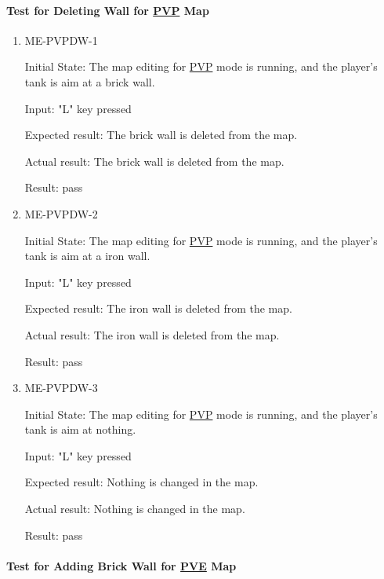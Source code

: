 \documentclass[12pt, titlepage]{article}
\begin{document}
\paragraph{Test for Deleting Wall for \underline{PVP} Map}

\begin{enumerate}

\item{ME-PVPDW-1\\}
					
Initial State: The map editing for \underline{PVP} mode is running, and the player's tank is aim at a brick wall.
					
Input: "L" key pressed
					
Expected result: The brick wall is deleted from the map.
					
Actual result: The brick wall is deleted from the map.

Result: pass

\item{ME-PVPDW-2\\}
					
Initial State: The map editing for \underline{PVP} mode is running, and the player's tank is aim at a iron wall.
					
Input: "L" key pressed
					
Expected result: The iron wall is deleted from the map.
					
Actual result: The iron wall is deleted from the map.

Result: pass

\item{ME-PVPDW-3\\}
					
Initial State: The map editing for \underline{PVP} mode is running, and the player's tank is aim at nothing.
					
Input: "L" key pressed
					
Expected result: Nothing is changed in the map.
					
Actual result: Nothing is changed in the map.

Result: pass

\end{enumerate}

\paragraph{Test for Adding Brick Wall for \underline{PVE} Map\\}
\end{document}

